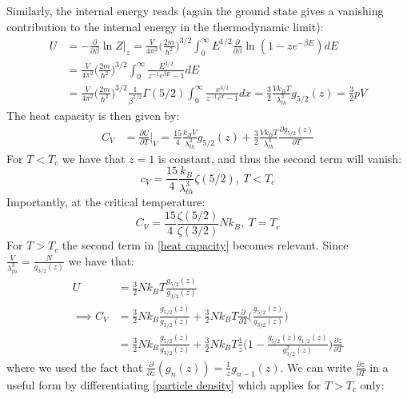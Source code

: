 \documentclass[a4paper,11pt,oneside]{book}
\begin{document}
Similarly, the internal energy reads (again the ground state gives a vanishing contribution to the internal energy in the thermodynamic limit):
\begin{align}
   U &= -\frac{\partial}{\partial \beta} \ln Z\bigg|_z= \frac{V}{4\pi^2}\bigg(\frac{2m}{\hbar^2}\bigg)^{3/2}\int_0^\infty E^{1/2}\frac{\partial}{\partial \beta} \ln(1-ze^{-\beta E})dE\\
    &=\frac{V}{4\pi^2}\bigg(\frac{2m}{\hbar^2}\bigg)^{3/2}\int_0^\infty \frac{E^{3/2}}{z^{-1}e^{\beta E}-1} dE\\
     &=\frac{V}{4\pi^2}\bigg(\frac{2m}{\hbar^2}\bigg)^{3/2}\frac{1}{\beta^{5/2}}\Gamma(5/2)\int_0^\infty \frac{x^{3/2}}{z^{-1}e^{x}-1} dx= \frac{3}{2}\frac{Vk_B T}{\lambda_{th}^3} g_{5/2}(z) = \frac{3}{2}pV
\end{align}
The heat capacity is then given by:
\begin{align}\label{heat capacity}
    C_V &= \frac{\partial U}{\partial T}\bigg|_V = \frac{15}{4}\frac{k_B V}{\lambda_{th}^3}g_{5/2}(z)+\frac{3}{2}\frac{Vk_BT}{\lambda_{th}^3}\frac{\partial g_{5/2}(z)}{\partial T}
\end{align}
For $T<T_c$ we have that $z=1$ is constant, and thus the second term will vanish:
\begin{equation}
    \boxed{c_V = \frac{15}{4}\frac{k_B}{\lambda_{th}^3}\zeta(5/2), \ T<T_c}
\end{equation}
Importantly, at the critical temperature:
\begin{equation}\label{specific heat cond}
    C_V = \frac{15}{4}\frac{\zeta(5/2)}{\zeta(3/2)}Nk_B, \ T=T_c
\end{equation}
For $T>T_c$ the second term in \eqref{heat capacity} becomes relevant. Since $\frac{V}{\lambda_{th}^3}=\frac{N}{g_{3/2}(z)}$ we have that:
\begin{align}
    U &= \frac{3}{2}Nk_B T\frac{g_{5/2}(z)}{g_{3/2}(z)}\\
    \implies C_V &= \frac{3}{2}Nk_B\frac{g_{5/2}(z)}{g_{3/2}(z)}+\frac{3}{2}Nk_B T \frac{\partial}{\partial T}\bigg(\frac{g_{5/2}(z)}{g_{3/2}(z)}\bigg)\\
    &=\frac{3}{2}Nk_B\frac{g_{5/2}(z)}{g_{3/2}(z)}+\frac{3}{2}Nk_B T \frac{1}{z}\bigg(1-\frac{g_{5/2}(z)g_{1/2}(z)}{g^2_{3/2}(z)}\bigg)\frac{\partial z}{\partial T}
\end{align}
where we used the fact that $\frac{\partial}{\partial z}(g_n(z)) = \frac{1}{z}g_{n-1}(z)$. We can write $\frac{\partial z}{\partial T}$ in a useful form by differentiating \eqref{particle density} which applies for $T>T_c$ only:
\end{document}
